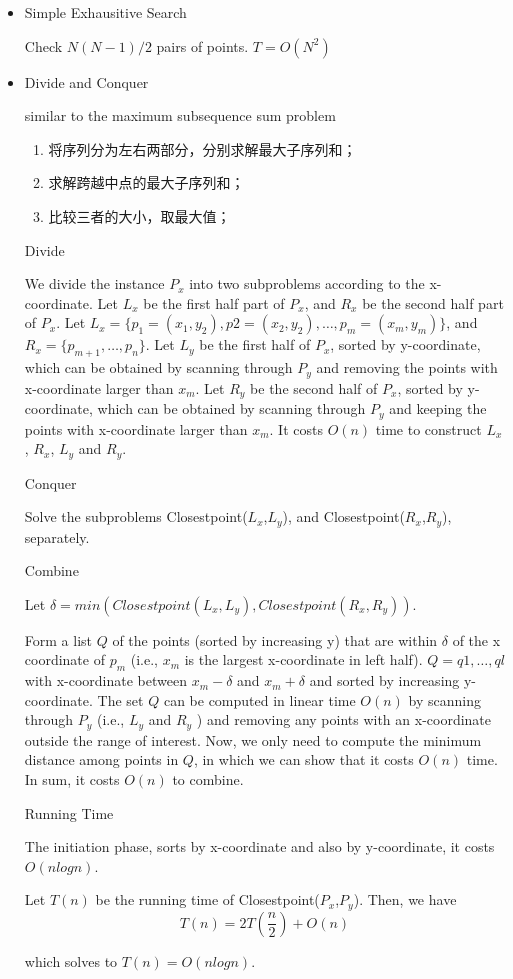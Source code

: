 \documentclass{article}
\begin{document}
\begin{itemize}
    \item Simple Exhausitive Search\par
    Check $N(N-1)/2$ pairs of points. $T = O(N^2)$
    \item Divide and Conquer\par
    similar to the maximum subsequence sum problem\par
    \begin{enumerate}
        \item 将序列分为左右两部分，分别求解最大子序列和；
        \item 求解跨越中点的最大子序列和；
        \item 比较三者的大小，取最大值；
    \end{enumerate}
\end{itemize}\par
\begin{itemize}
    \item [Divide]\par
    We divide the instance $P_x$ into two subproblems according to the x-coordinate. Let $L_x$ be the first half part of $P_x$, and $R_x$ be the second half part of $P_x$. Let $L_x = \{ p_1 = (x_1, y_2), p2 = (x_2, y_2), \dots , p_m = (x_m, y_m)\}$, and $R_x = \{ p_{m+1}, \dots , p_n \}$. Let $L_y$ be the first half of $P_x$, sorted by y-coordinate, which can be obtained by scanning through $P_y$ and removing the points with x-coordinate larger than $x_m$. Let $R_y$ be the second half of $P_x$, sorted by y-coordinate, which can be obtained by scanning through $P_y$ and keeping the points with x-coordinate larger than $x_m$. It costs $O(n)$ time to construct $L_x$, $R_x$, $L_y$ and $R_y$.
    \item [Conquer]\par
    Solve the subproblems Closestpoint($L_x$,$L_y$), and Closestpoint($R_x$,$R_y$), separately.
    \item [Combine]\par
    Let $\delta = min(Closestpoint(L_x, L_y), Closestpoint(R_x, R_y))$.\par
    Form a list $Q$ of the points (sorted by increasing y) that are within $\delta$ of the x coordinate of $p_m$ (i.e., $x_m$ is the largest x-coordinate in left half). $Q = {q1, \dots , ql}$ with x-coordinate between $x_m - \delta$ and $x_m + \delta$ and sorted by increasing y-coordinate. The set $Q$ can be computed in linear time $O(n)$ by scanning through $P_y$ (i.e., $L_y$ and $R_y$ ) and removing any points with an x-coordinate outside the range of interest. Now, we only need to compute the minimum distance among points in $Q$, in which we can show that it costs $O(n)$ time. In sum, it costs $O(n)$ to combine.
    \item [Running Time]\par
    The initiation phase, sorts by x-coordinate and also by y-coordinate, it costs $O(n log n)$.\par
    Let $T(n)$ be the running time of Closestpoint($P_x$,$P_y$). Then, we have
    $$T(n) = 2T(\frac{n}{2}) + O(n)$$\par
    which solves to $T(n) = O(n log n)$.
\end{itemize}
\end{document}
